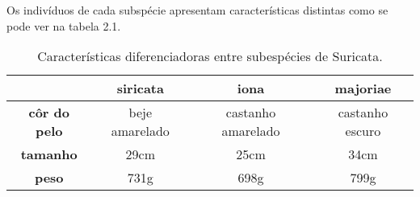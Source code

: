 \documentclass[11pt, a4paper]{report}
\begin{document}
Os indivíduos de cada subspécie apresentam características distintas
como se pode ver na tabela 2.1.
\begin{table}[h]
\begin{tabular}{|c|c|c|c|}
\hline
\rowcolor[HTML]{9B9B9B} 
{\color[HTML]{343434} }                     & {\color[HTML]{343434} \textbf{siricata}} & {\color[HTML]{343434} \textbf{iona}}      & {\color[HTML]{343434} \textbf{majoriae}} \\ \hline
{\color[HTML]{343434} \textbf{côr do pelo}} & {\color[HTML]{343434} beje amarelado}    & {\color[HTML]{343434} castanho amarelado} & {\color[HTML]{343434} castanho escuro}   \\ \hline
{\color[HTML]{343434} \textbf{tamanho}}     & {\color[HTML]{343434} 29cm}              & {\color[HTML]{343434} 25cm}               & {\color[HTML]{343434} 34cm}              \\ \hline
{\color[HTML]{343434} \textbf{peso}}        & {\color[HTML]{343434} 731g}              & {\color[HTML]{343434} 698g}               & {\color[HTML]{343434} 799g}              \\ \hline
\end{tabular}
\caption{Características diferenciadoras entre subespécies de Suricata.}
\end{table}
\end{document}
